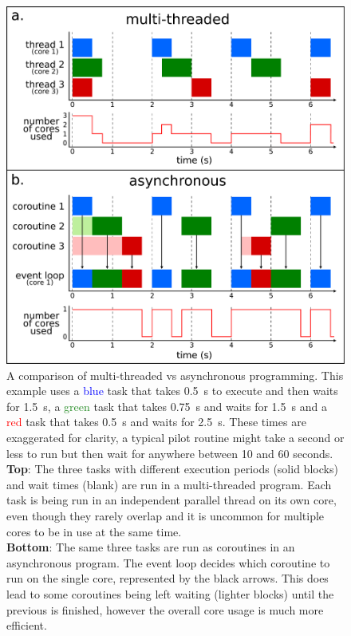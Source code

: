 \begin{colsection}
\begin{colsection}
\begin{figure}[p]
\begin{center}
\includegraphics[width=0.9\linewidth]{images/async.pdf}
\end{center}
\caption[Multi-threaded vs asynchronous programming]{A comparison of multi-threaded vs asynchronous programming. This example uses a \textcolor{blue}{blue} task that takes \SI{0.5}{\second} to execute and then waits for \SI{1.5}{\second}, a \textcolor{ForestGreen}{green} task that takes \SI{0.75}{\second} and waits for \SI{1.5}{\second} and a \textcolor{red}{red} task that takes \SI{0.5}{\second} and waits for \SI{2.5}{\second}. These times are exaggerated for clarity, a typical pilot routine might take a second or less to run but then wait for anywhere between 10 and 60 seconds.
\\
\textbf{Top}: The three tasks with different execution periods (solid blocks) and wait times (blank) are run in a multi-threaded program. Each task is being run in an independent parallel thread on its own core, even though they rarely overlap and it is uncommon for multiple cores to be in use at the same time.
\\
\textbf{Bottom}: The same three tasks are run as coroutines in an asynchronous program. The event loop decides which coroutine to run on the single core, represented by the black arrows. This does lead to some coroutines being left waiting (lighter blocks) until the previous is finished, however the overall core usage is much more efficient.}
\label{fig:async}
\end{figure}


\end{colsection}
\end{colsection}
